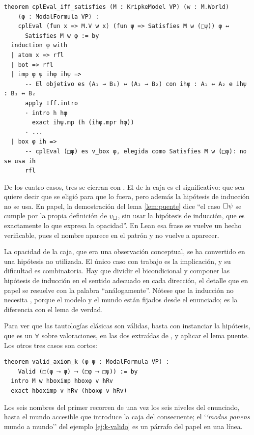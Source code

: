 \begin{lstlisting}
theorem cplEval_iff_satisfies (M : KripkeModel VP) (w : M.World)
    (φ : ModalFormula VP) :
    cplEval (fun x => M.V w x) (fun ψ => Satisfies M w (□ψ)) φ ↔
      Satisfies M w φ := by
  induction φ with
  | atom x => rfl
  | bot => rfl
  | imp φ ψ ihφ ihψ =>
      -- El objetivo es (A₁ → B₁) ↔ (A₂ → B₂) con ihφ : A₁ ↔ A₂ e ihψ : B₁ ↔ B₂
      apply Iff.intro
      · intro h hφ
        exact ihψ.mp (h (ihφ.mpr hφ))
      · ...
  | box φ ih =>
      -- cplEval (□φ) es v_box φ, elegida como Satisfies M w (□φ): no se usa ih
      rfl
\end{lstlisting}

De los cuatro casos, tres se cierran con . El de la caja es el significativo: que sea  quiere decir que  se eligió para que lo fuera, pero además la hipótesis de inducción no se usa. En papel, la demostración del lema \ref{lem:puente} dice ``el caso $\square\psi$ se cumple por la propia definición de $v_\square$, sin usar la hipótesis de inducción, que es exactamente lo que expresa la opacidad''. En Lean esa frase se vuelve un hecho verificable, pues el nombre  aparece en el patrón y no vuelve a aparecer.

La opacidad de la caja, que era una observación conceptual, se ha convertido en una hipótesis no utilizada. El único caso con trabajo es la implicación, y su dificultad es combinatoria. Hay que dividir el bicondicional y componer las hipótesis de inducción en el sentido adecuado en cada dirección, el detalle que en papel se resuelve con la palabra ``análogamente''. Nótese que la inducción no necesita , porque el modelo y el mundo están fijados desde el enunciado; es la diferencia con el lema de verdad.

Para ver que las tautologías clásicas son válidas, basta con instanciar la hipótesis, que es un $\forall$ sobre valoraciones, en las dos extraídas de , y aplicar el lema puente. Los otros tres casos son cortos:

\begin{lstlisting}
theorem valid_axiom_k (φ ψ : ModalFormula VP) :
    Valid (□(φ ⟶ ψ) ⟶ (□φ ⟶ □ψ)) := by
  intro M w hboximp hboxφ v hRv
  exact hboximp v hRv (hboxφ v hRv)
\end{lstlisting}

Los seis nombres del primer  recorren de una vez los seis niveles del enunciado, hasta el mundo accesible que introduce la caja del consecuente; el `\emph{`modus ponens} mundo a mundo'' del ejemplo \ref{ej:k-valido} es un párrafo del papel en una línea.


